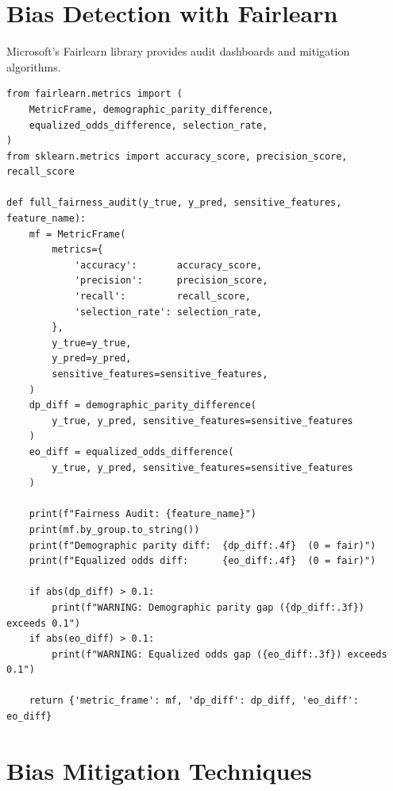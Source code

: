 \section{Bias Detection with Fairlearn}
\label{sec:a14-fairlearn}

Microsoft's Fairlearn library provides audit dashboards and mitigation algorithms.

\begin{lstlisting}[style=python, caption={Full fairness audit with Fairlearn}]
from fairlearn.metrics import (
    MetricFrame, demographic_parity_difference,
    equalized_odds_difference, selection_rate,
)
from sklearn.metrics import accuracy_score, precision_score, recall_score

def full_fairness_audit(y_true, y_pred, sensitive_features, feature_name):
    mf = MetricFrame(
        metrics={
            'accuracy':       accuracy_score,
            'precision':      precision_score,
            'recall':         recall_score,
            'selection_rate': selection_rate,
        },
        y_true=y_true,
        y_pred=y_pred,
        sensitive_features=sensitive_features,
    )
    dp_diff = demographic_parity_difference(
        y_true, y_pred, sensitive_features=sensitive_features
    )
    eo_diff = equalized_odds_difference(
        y_true, y_pred, sensitive_features=sensitive_features
    )

    print(f"Fairness Audit: {feature_name}")
    print(mf.by_group.to_string())
    print(f"Demographic parity diff:  {dp_diff:.4f}  (0 = fair)")
    print(f"Equalized odds diff:      {eo_diff:.4f}  (0 = fair)")

    if abs(dp_diff) > 0.1:
        print(f"WARNING: Demographic parity gap ({dp_diff:.3f}) exceeds 0.1")
    if abs(eo_diff) > 0.1:
        print(f"WARNING: Equalized odds gap ({eo_diff:.3f}) exceeds 0.1")

    return {'metric_frame': mf, 'dp_diff': dp_diff, 'eo_diff': eo_diff}
\end{lstlisting}

\section{Bias Mitigation Techniques}
\label{sec:a14-mitigation}

